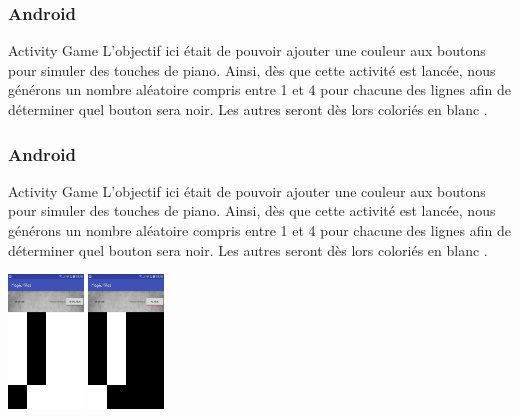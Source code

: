 \documentclass{beamer}
\begin{document}
\begin{frame}
\frametitle{Android}
\begin{block}{Activity Game}
	L'objectif ici était de pouvoir ajouter une couleur aux boutons pour simuler des touches de
piano. Ainsi, dès que cette activité est lancée, nous générons{ \color{red} un nombre aléatoire compris entre 1
et 4} pour chacune des lignes afin de déterminer quel bouton sera {\color{red} noir}. Les autres seront dès lors
coloriés en blanc .

\end{block}
\end{frame}


\begin{frame}
\frametitle{Android}
\begin{block}{Activity Game}
	L'objectif ici était de pouvoir ajouter une couleur aux boutons pour simuler des touches de
piano. Ainsi, dès que cette activité est lancée, nous générons{ \color{red} un nombre aléatoire compris entre 1
et 4} pour chacune des lignes afin de déterminer quel bouton sera {\color{red} noir}. Les autres seront dès lors
coloriés en blanc .

\end{block}

    \begin{center}
      \includegraphics[width=20mm]{AndroidGame}
      \includegraphics[width=20mm]{AndroidGameInvers}

    \end{center}
   
\end{frame}

\end{document}
